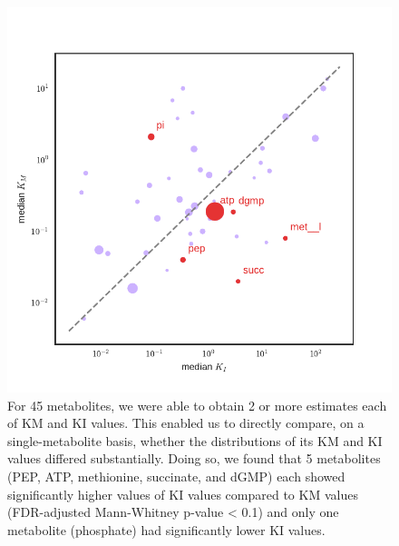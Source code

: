 \documentclass[12pt,a4paper]{article}
\begin{document}
\begin{figure}[ht!]
	\includegraphics[width=\textwidth]{../manuscript/figS6.pdf}
	\caption{For 45 metabolites, we were able to obtain 2 or more estimates each of KM and KI values. This enabled us to directly compare, on a single-metabolite basis, whether the distributions of its KM and KI values differed substantially. Doing so, we found that 5 metabolites (PEP, ATP, methionine, succinate, and dGMP) each showed significantly higher values of KI values compared to KM values (FDR-adjusted Mann-Whitney p-value < 0.1) and only one metabolite (phosphate) had significantly lower KI values.
	}
\end{figure}
\end{document}
